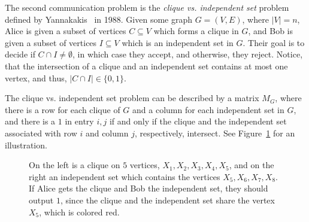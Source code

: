 \documentclass[11pt]{article}
\begin{document}
The second communication problem is the {\em clique vs. independent set} problem defined by Yannakakis~\cite{Yannakakis91} in 1988.
Given some graph $G = (V,E)$, where $|V| = n$, Alice is given a subset of vertices $C \subseteq V$ which forms a clique in $G$,
and Bob is given a subset of vertices $I \subseteq V$ which is an independent set in $G$.
Their goal is to decide if $C \cap I \neq \emptyset$, in which case they accept, and otherwise, they reject.
Notice, that the intersection of a clique and an independent set contains at most one vertex, and thus, $|C \cap I| \in \{0, 1\}$.

The clique vs. independent set problem can be described by a matrix $M_G$, where there is a row for each clique of $G$ and a column for each independent set  in $G$,
and there is a $1$ in entry $i,j$
if and only if the clique and the independent set associated with row $i$ and column $j$, respectively, intersect. See Figure~\ref{fig:clique-independent} for an illustration.

\begin{figure}[htb!]
\centering
{}
\caption{On the left is a clique on $5$ vertices, $X_1, X_2, X_3, X_4,X_5$, and on the right an independent set which contains the vertices $X_5,X_6,X_7,X_8$.
If Alice gets the clique and Bob the independent set, they should output $1$, since the clique and the independent set share the vertex $X_5$, which is colored red.}
\label{fig:clique-independent}
\end{figure}
\end{document}
